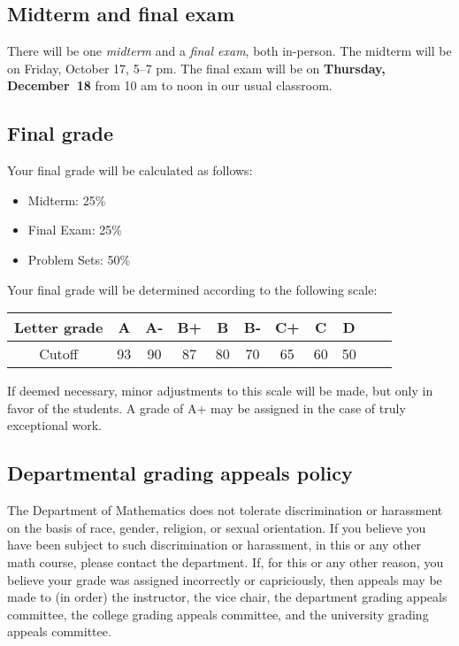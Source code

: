 \documentclass[12pt]{amsart}
\begin{document}
\subsection*{Midterm and final exam} There will be one {\it midterm} and a {\it final exam}, both in-person. The midterm will be on Friday, October 17, 5--7 pm.
The final exam will be on 
{\bf Thursday, December~18} from 10 am to noon in our usual classroom.



\subsection*{Final grade} Your final grade will be calculated as follows:

\begin{itemize}

	\item Midterm: 25\%
	\item Final Exam: 25\%
	\item Problem Sets: 50\%
\end{itemize}

\noindent
Your final grade will be determined according to the following scale:

\begin{center}
\hspace{2em}
\begin{minipage}{0.75\textwidth}
	\begin{tabular}{|c||c|c|c|c|c|c|c|c|c|c|}
	\hline
	Letter grade & A & A- & B+ & B & B- & C+ & C & D \\
	\hline
	Cutoff & 93 & 90 & 87 & 80 & 70 & 65 & 60 & 50 \\
	\hline
\end{tabular}
\end{minipage}
\end{center}

\noindent
If deemed necessary, minor adjustments to this scale will be made, but only in favor of the students. A grade of A+ may be assigned in the case of truly exceptional work.

\subsection*{Departmental grading appeals policy} 
The Department of Mathematics does not tolerate discrimination or harassment on the basis of race, gender, religion, or sexual orientation. If you believe you have been subject to such discrimination or harassment, in this or any other math course, please contact the department. If, for this or any other reason, you believe your grade was assigned incorrectly or capriciously, then appeals may be made to (in order) the instructor, the vice chair, the department grading appeals committee, the college grading appeals committee, and the university grading appeals committee.
\end{document}

